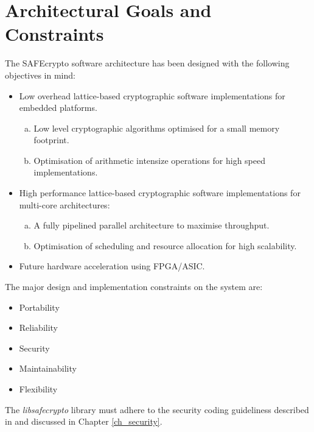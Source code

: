 
\chapter{Architectural Goals and Constraints}
\label{ch_goals_and_constraints}

The SAFEcrypto software architecture has been designed with the following objectives in mind:

\begin{itemize}
\item Low overhead lattice-based cryptographic software implementations for embedded platforms.
  \begin{enumerate}[(a)]
  \item Low level cryptographic algorithms optimised for a small memory footprint.
  \item Optimisation of arithmetic intensize operations for high speed implementations.
  \end{enumerate}
\item High performance lattice-based cryptographic software implementations for multi-core architectures:
  \begin{enumerate}[(b)]
  \item A fully pipelined parallel architecture to maximise throughput.
  \item Optimisation of scheduling and resource allocation for high scalability.
  \end{enumerate}
\item Future hardware acceleration using FPGA/ASIC.
\end{itemize}

\vspace{5mm}

\noindent
The major design and implementation constraints on the system are:

\begin{itemize}
\item Portability
\item Reliability
\item Security
\item Maintainability
\item Flexibility
\end{itemize}

\vspace{5mm}

The \textit{libsafecrypto} library must adhere to the security coding guideliness described in \cite{safecrypto_secure_coding_guidelines} and discussed in Chapter \ref{ch_security}.
